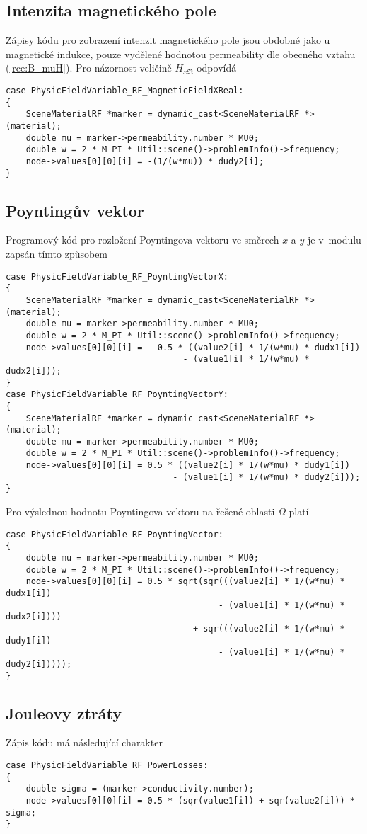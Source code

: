 \subsection*{Intenzita magnetického pole}
Zápisy kódu pro zobrazení intenzit magnetického pole jsou obdobné jako u magnetické indukce, pouze vydělené hodnotou permeability dle obecného vztahu (\ref{rce:B_muH}).
Pro názornost veličině $H_{x\Re}$ odpovídá
\begin{verbatim}
case PhysicFieldVariable_RF_MagneticFieldXReal:
{
    SceneMaterialRF *marker = dynamic_cast<SceneMaterialRF *>(material);
    double mu = marker->permeability.number * MU0;
    double w = 2 * M_PI * Util::scene()->problemInfo()->frequency;
    node->values[0][0][i] = -(1/(w*mu)) * dudy2[i];
}
\end{verbatim}

\subsection*{Poyntingův vektor}
Programový kód pro rozložení Poyntingova vektoru ve směrech $x$ a $y$ je v~modulu zapsán tímto způsobem
\begin{verbatim}
case PhysicFieldVariable_RF_PoyntingVectorX:
{
    SceneMaterialRF *marker = dynamic_cast<SceneMaterialRF *>(material);
    double mu = marker->permeability.number * MU0;
    double w = 2 * M_PI * Util::scene()->problemInfo()->frequency;
    node->values[0][0][i] = - 0.5 * ((value2[i] * 1/(w*mu) * dudx1[i]) 
                                   - (value1[i] * 1/(w*mu) * dudx2[i]));
}
case PhysicFieldVariable_RF_PoyntingVectorY:
{
    SceneMaterialRF *marker = dynamic_cast<SceneMaterialRF *>(material);
    double mu = marker->permeability.number * MU0;
    double w = 2 * M_PI * Util::scene()->problemInfo()->frequency;
    node->values[0][0][i] = 0.5 * ((value2[i] * 1/(w*mu) * dudy1[i]) 
                                 - (value1[i] * 1/(w*mu) * dudy2[i]));
}
\end{verbatim}
Pro výslednou hodnotu Poyntingova vektoru na řešené oblasti $\Omega$ platí
\begin{verbatim}
case PhysicFieldVariable_RF_PoyntingVector:
{
    double mu = marker->permeability.number * MU0;
    double w = 2 * M_PI * Util::scene()->problemInfo()->frequency;
    node->values[0][0][i] = 0.5 * sqrt(sqr(((value2[i] * 1/(w*mu) * dudx1[i]) 
                                          - (value1[i] * 1/(w*mu) * dudx2[i]))) 
                                     + sqr(((value2[i] * 1/(w*mu) * dudy1[i]) 
                                          - (value1[i] * 1/(w*mu) * dudy2[i]))));
}
\end{verbatim}

\subsection*{Jouleovy ztráty}
Zápis kódu má následující charakter
\begin{verbatim}
case PhysicFieldVariable_RF_PowerLosses:
{
    double sigma = (marker->conductivity.number);
    node->values[0][0][i] = 0.5 * (sqr(value1[i]) + sqr(value2[i])) * sigma;
}
\end{verbatim}
